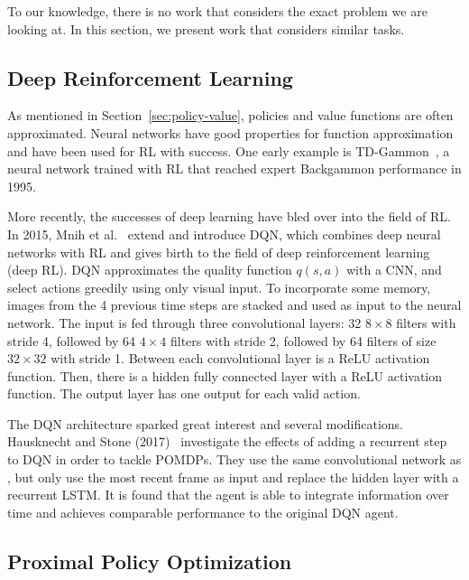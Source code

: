 To our knowledge, there is no work that considers the exact problem we are looking at.
In this section, we present work that considers similar tasks.

\subsection{Deep Reinforcement Learning}


As mentioned in Section~\ref{sec:policy-value}, policies and value functions are often approximated.
Neural networks have good properties for function approximation and have been used for RL with success.
One early example is TD-Gammon~\cite{tesauro1995tdgammon}, a neural network trained with RL that reached expert Backgammon performance in 1995.

More recently, the successes of deep learning have bled over into the field of RL.
In 2015, Mnih et al.~\cite{mnih_human_2015} extend \cite{mnih_atari_2013} and introduce DQN, which combines deep neural networks with RL and gives birth to the field of deep reinforcement learning (deep RL).
DQN approximates the quality function \(q(s, a)\) with a CNN, and select actions greedily using only visual input.
To incorporate some memory, images from the 4 previous time steps are stacked and used as input to the neural network.
The input is fed through three convolutional layers:
32 \(8\times8\) filters with stride 4,
followed by 64 \(4\times4\) filters with stride 2,
followed by 64 filters of size \(32\times32\) with stride 1.
Between each convolutional layer is a ReLU activation function.
Then, there is a hidden fully connected layer with a ReLU activation function.
The output layer has one output for each valid action.

The DQN architecture sparked great interest and several modifications.
Hausknecht and Stone (2017)~\cite{hausknecht_stone_2017} investigate the effects of adding a recurrent step to DQN in order to tackle POMDPs.
They use the same convolutional network as \cite{mnih_human_2015}, but only use the most recent frame as input and replace the hidden layer with a recurrent LSTM.
It is found that the agent is able to integrate information over time and achieves comparable performance to the original DQN agent.

\subsection{Proximal Policy Optimization}

